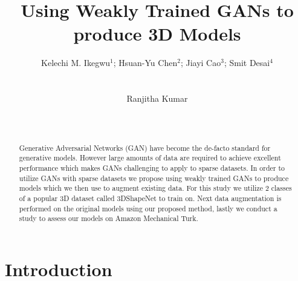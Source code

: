 \documentclass{sigchi}
\begin{document}
\title{Using Weakly Trained GANs to produce 3D Models}

\author{
  \alignauthor Kelechi M. Ikegwu\(^1\); Hsuan-Yu Chen\(^2\); Jiayi Cao\(^3\); Smit Desai\(^4\)\\
    \\
    \\
  \alignauthor Ranjitha Kumar\\
    \\
    \\
}

\maketitle

\begin{abstract}
Generative Adversarial Networks (GAN) have become the de-facto standard for generative models. However large amounts of data are required to achieve excellent performance which makes GANs challenging to apply to sparse datasets. In order to utilize GANs with sparse datasets we propose using weakly trained GANs to produce models which we then use to augment existing data. For this study we utilize 2 classes of a popular 3D dataset called 3DShapeNet to train on. Next data augmentation is performed on the original models using our proposed method, lastly we conduct a study to assess our models on Amazon Mechanical Turk.

\end{abstract}



\section{Introduction}
\end{document}
